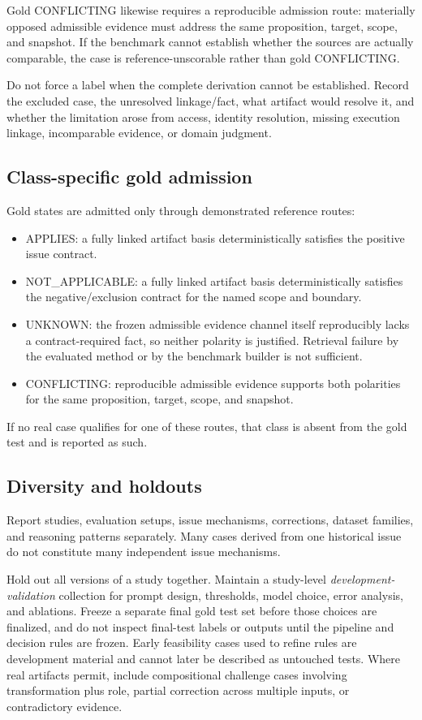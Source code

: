\documentclass[11pt,a4paper]{article}
\newcommand{\status}[1]{\textsf{\small #1}}
\begin{document}
Gold \status{CONFLICTING} likewise requires a reproducible admission route: materially opposed admissible evidence must address the same proposition, target, scope, and snapshot. If the benchmark cannot establish whether the sources are actually comparable, the case is reference-unscorable rather than gold \status{CONFLICTING}.

Do not force a label when the complete derivation cannot be established. Record the excluded case, the unresolved linkage/fact, what artifact would resolve it, and whether the limitation arose from access, identity resolution, missing execution linkage, incomparable evidence, or domain judgment.

\subsection{Class-specific gold admission}
Gold states are admitted only through demonstrated reference routes:
\begin{itemize}
\item \status{APPLIES}: a fully linked artifact basis deterministically satisfies the positive issue contract.
\item \status{NOT\_APPLICABLE}: a fully linked artifact basis deterministically satisfies the negative/exclusion contract for the named scope and boundary.
\item \status{UNKNOWN}: the frozen admissible evidence channel itself reproducibly lacks a contract-required fact, so neither polarity is justified. Retrieval failure by the evaluated method or by the benchmark builder is not sufficient.
\item \status{CONFLICTING}: reproducible admissible evidence supports both polarities for the same proposition, target, scope, and snapshot.
\end{itemize}
If no real case qualifies for one of these routes, that class is absent from the gold test and is reported as such.

\subsection{Diversity and holdouts}
Report studies, evaluation setups, issue mechanisms, corrections, dataset families, and reasoning patterns separately. Many cases derived from one historical issue do not constitute many independent issue mechanisms.

Hold out all versions of a study together. Maintain a study-level \emph{development-validation} collection for prompt design, thresholds, model choice, error analysis, and ablations. Freeze a separate final gold test set before those choices are finalized, and do not inspect final-test labels or outputs until the pipeline and decision rules are frozen. Early feasibility cases used to refine rules are development material and cannot later be described as untouched tests. Where real artifacts permit, include compositional challenge cases involving transformation plus role, partial correction across multiple inputs, or contradictory evidence.
\end{document}
